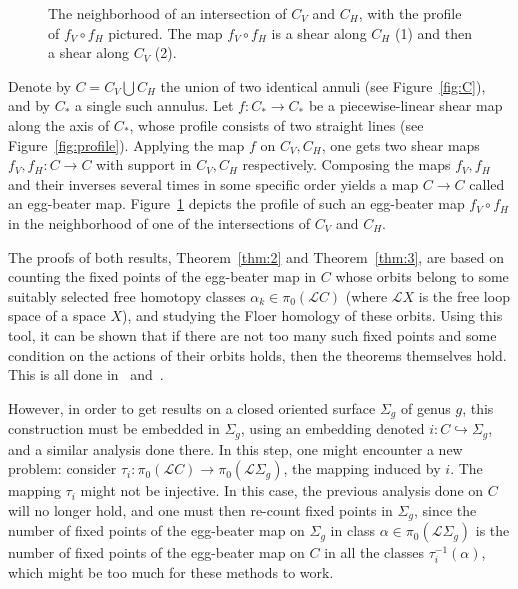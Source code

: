 \documentclass[11pt]{article}
\begin{document}
\begin{figure}[!ht]
\begin{minipage}{.48\textwidth}
{}
                \caption{The neighborhood of an intersection of $C_V$ and $C_H$, with the profile of $f_V \circ f_H$ pictured. The map $f_V \circ f_H$ is a shear along $C_H$ (1) and then a shear along $C_V$ (2).}
                \label{fig:profile2}
            \end{minipage}
        \end{figure}
        
        Denote by $C = C_V \bigcup C_H$ the union of two identical annuli (see Figure~\ref{fig:C}), and by $C_*$ a single such annulus. Let $f: C_* \to C_*$ be a piecewise-linear shear map along the axis of $C_*$, whose profile consists of two straight lines (see Figure~\ref{fig:profile}). Applying the map $f$ on $C_V,C_H$, one gets two shear maps $f_V,f_H: C \to C$ with support in $C_V,C_H$ respectively. Composing the maps $f_V,f_H$ and their inverses several times in some specific order yields a map $C \to C$ called an egg-beater map. Figure~\ref{fig:profile2} depicts the profile of such an egg-beater map $f_V \circ f_H$ in the neighborhood of one of the intersections of $C_V$ and $C_H$.
        
        The proofs of both results, Theorem~\ref{thm:2} and Theorem~\ref{thm:3}, are based on counting the fixed points of the egg-beater map in $C$ whose orbits belong to some suitably selected free homotopy classes $\alpha_k \in \pi_0(\mathscr{L}C)$ (where $\mathscr{L}X$ is the free loop space of a space $X$), and studying the Floer homology of these orbits. Using this tool, it can be shown that if there are not too many such fixed points and some condition on the actions of their orbits holds, then the theorems themselves hold. This is all done in~\cite{PS14} and~\cite{10}.
        
        However, in order to get results on a closed oriented surface $\Sigma_g$ of genus $g$, this construction must be embedded in $\Sigma_g$, using an embedding denoted $i: C \hookrightarrow \Sigma_g$, and a similar analysis done there. In this step, one might encounter a new problem: consider $\tau_i: \pi_0(\mathscr{L}C) \to \pi_0(\mathscr{L}\Sigma_g)$, the mapping induced by $i$. The mapping $\tau_i$ might not be injective. In this case, the previous analysis done on $C$ will no longer hold, and one must then re-count fixed points in $\Sigma_g$, since the number of fixed points of the egg-beater map on $\Sigma_g$ in class $\alpha \in \pi_0(\mathscr{L}\Sigma_g)$ is the number of fixed points of the egg-beater map on $C$ in all the classes $\tau_i^{-1}(\alpha)$, which might be too much for these methods to work.
        
\end{document}
